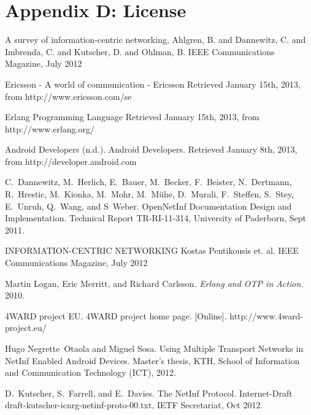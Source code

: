 \documentclass[11pt]{report}
\begin{document}
\chapter {Appendix D: License}


\begin{thebibliography}{99}

 A survey of information-centric networking,
 \newblock Ahlgren, B. and Dannewitz, C. and Imbrenda, C. and Kutscher, D. and Ohlman, B.
 \newblock IEEE Communications Magazine, July 2012

 Ericsson - A world of communication - Ericsson
 \newblock  Retrieved January 15th, 2013, from http://www.ericsson.com/se
 

Erlang Programming Language
\newblock Retrieved January 15th, 2013, from http://www.erlang.org/

Android Developers (n.d.). 
\newblock Android Developers. 
\newblock Retrieved January 8th, 2013, from http://developer.android.com

C.~Dannewitz, M.~Herlich, E.~Bauer, M.~Becker, F.~Beister, N.~Dertmann,
  R.~Hrestic, M.~Kionka, M.~Mohr, M.~M\"uhe, D.~Murali, F.~Steffen, S.~Stey,
  E.~Unruh, Q.~Wang, and S~Weber.
\newblock OpenNetInf Documentation Design and Implementation.
\newblock Technical Report TR-RI-11-314, University of Paderborn, Sept 2011.
 

 INFORMATION-CENTRIC NETWORKING Kostas Pentikousis et. al. IEEE Communications Magazine, July 2012

 Martin Logan, Eric Merritt, and Richard Carlsson. \textsl{Erlang and OTP in Action}. 2010.

 4WARD project EU. 4WARD project home page. [Online]. http://www.4ward-project.eu/

Hugo Negrette~Otaola and Miguel Sosa.
\newblock Using Multiple Transport Networks in NetInf Enabled Android Devices.
\newblock Master's thesis, KTH, School of Information and Communication
  Technology (ICT), 2012.

D.~Kutscher, S.~Farrell, and E.~Davies.
\newblock The NetInf Protocol.
\newblock Internet-Draft draft-kutscher-icnrg-netinf-proto-00.txt, IETF
  Secretariat, Oct 2012.






\end{thebibliography}
\end{document}
